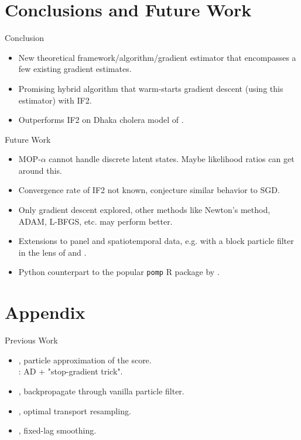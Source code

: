 \documentclass{beamer}
\begin{document}
\section{Conclusions and Future Work}

\begin{frame}{Conclusion}
    \begin{itemize}
        \item New theoretical framework/algorithm/gradient estimator that encompasses a few existing gradient estimates.
        \item \pause Promising hybrid algorithm that warm-starts gradient descent (using this estimator) with IF2.
        \item \pause Outperforms IF2 on Dhaka cholera model of \cite{king15}.
    \end{itemize}
\end{frame}


\begin{frame}{Future Work}
    \begin{itemize}
        \item MOP-$\alpha$ cannot handle discrete latent states. Maybe likelihood ratios can get around this.
        \item \pause Convergence rate of IF2 not known, conjecture similar behavior to SGD. 
        \item \pause Only gradient descent explored, other methods like Newton's method, ADAM, L-BFGS, etc. may perform better.
        \item \pause Extensions to panel and spatiotemporal data, e.g. with a block particle filter in the lens of \cite{ionides22} and \cite{ning23}.
        \item \pause Python counterpart to the popular \texttt{pomp} R package by \citet{king16}.
    \end{itemize}
\end{frame}





\appendix
\section{Appendix}


\begin{frame}{Previous Work}

    
    \begin{itemize}
        \item \cite{poyiadjis11}, particle approximation of the score. \pause \\ \cite{scibior21}: AD + "stop-gradient trick". 
        \item 
        \pause \cite{naesseth18}, backpropagate through vanilla particle filter.
        \item 
        \pause \cite{corenflos21}, optimal transport resampling.
        \item 
        \pause \cite{singh22}, fixed-lag smoothing.
    \end{itemize}
\end{frame}
\end{document}
